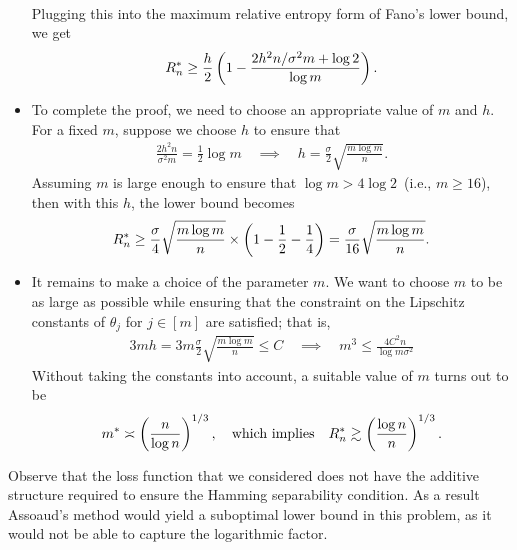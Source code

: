 \documentclass[12pt]{article}
\begin{document}
\begin{itemize}
\begin{align}
	\end{align}
	Plugging this into the maximum relative entropy form of Fano's lower bound, we get 
	\begin{align}
		R_n^* \geq \frac{h}{2} \left( 1 - \frac{2h^2n/\sigma^2m + \log 2}{\log m} \right). 
	\end{align}
	\item To complete the proof, we need to choose an appropriate value of $m$ and $h$. For a fixed $m$, suppose we choose $h$ to ensure that 
	\begin{align}
		\frac{2 h^2 n}{\sigma^2 m} = \frac{1}{2} \log m \quad \implies \quad 
		h = \frac{\sigma}{2}\sqrt{\frac{m \log m}{n}}. 
	\end{align}
	Assuming $m$ is large enough to ensure that $\log m > 4 \log 2$~(i.e., $m \geq 16$), then with this $h$, the lower bound becomes 
	\begin{align}
		R_n^* \geq \frac{\sigma}{4}\sqrt{\frac{m \log m}{n}} \times \left( 1 - \frac{1}{2} - \frac{1}{4} \right) = 
	\frac{\sigma}{16}\sqrt{\frac{m \log m}{n}}. 
	\end{align}
	\item It remains to make a choice of the parameter $m$. We want to choose $m$ to be as large as possible while ensuring that the constraint on the Lipschitz constants of $\theta_j$ for $j \in [m]$ are satisfied; that is, 
	\begin{align}
		3 m h = 3 m \frac{\sigma}{2} \sqrt{\frac{m \log m}{n}} \leq C \quad \implies \quad 
		m^3 \leq \frac{4C^2 n}{\log m \sigma^2}
	\end{align}
	Without taking the constants into account, a suitable value of $m$ turns out to be 
	\begin{align}
	m^* \asymp \left( \frac{n}{\log n} \right)^{1/3}, \quad \text{which implies} \quad R_n^* \gtrsim \left( \frac{\log n}{n} \right)^{1/3}. 
	\end{align}
\end{itemize}

\begin{remark}
Observe that the loss function that we considered does not have the additive structure required to ensure the Hamming separability condition. As a result Assoaud's method would yield a suboptimal lower bound in this problem, as it would not be able to capture the logarithmic factor. 
\end{remark}
\end{document}
